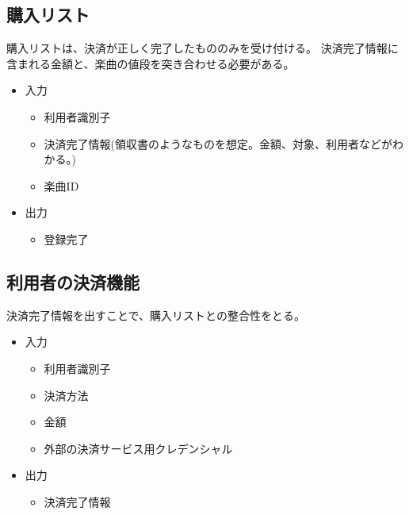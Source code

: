 \documentclass[a4paper,10pt]{jsarticle}
\begin{document}
\subsection{購入リスト}
購入リストは、決済が正しく完了したもののみを受け付ける。
決済完了情報に含まれる金額と、楽曲の値段を突き合わせる必要がある。
\begin{itemize}
  \item 入力
        \begin{itemize}
          \item 利用者識別子
          \item 決済完了情報(領収書のようなものを想定。金額、対象、利用者などがわかる。)
          \item 楽曲ID
        \end{itemize}
  \item 出力
        \begin{itemize}
          \item 登録完了
        \end{itemize}
\end{itemize}

\subsection{利用者の決済機能}
決済完了情報を出すことで、購入リストとの整合性をとる。
\begin{itemize}
  \item 入力
        \begin{itemize}
          \item 利用者識別子
          \item 決済方法
          \item 金額
          \item 外部の決済サービス用クレデンシャル
        \end{itemize}
  \item 出力
        \begin{itemize}
          \item 決済完了情報
        \end{itemize}
\end{itemize}
\end{document}
